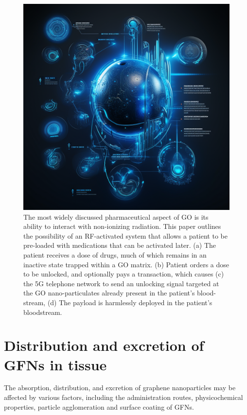 \documentclass[twoside,twocolumn,9pt]{article}
\begin{document}
\begin{figure}
    \centering
    \includegraphics[width=1.0\linewidth]{rf_modulated_graphene_oxide_drugs.png}
    \caption{The most widely discussed pharmaceutical aspect of GO is its ability to interact with non-ionizing radiation. This paper outlines the possibility of an RF-activated system that allows a patient to be pre-loaded with medications that can be activated later. (a) The patient receives a dose of drugs, much of which remains in an inactive state trapped within a GO matrix. (b) Patient orders a dose to be unlocked, and optionally pays a transaction, which causes (c) the 5G telephone network to send an unlocking signal targeted at the GO nano-particulates already present in the patient's blood-stream, (d) The payload is harmlessly deployed in the patient's bloodstream.}
    \label{fig:4}
\end{figure}

\section{Distribution and excretion of GFNs in tissue}
The absorption, distribution, and excretion of graphene nanoparticles may be affected by various factors, including the administration routes, physicochemical properties, particle agglomeration and surface coating of GFNs.
\end{document}
